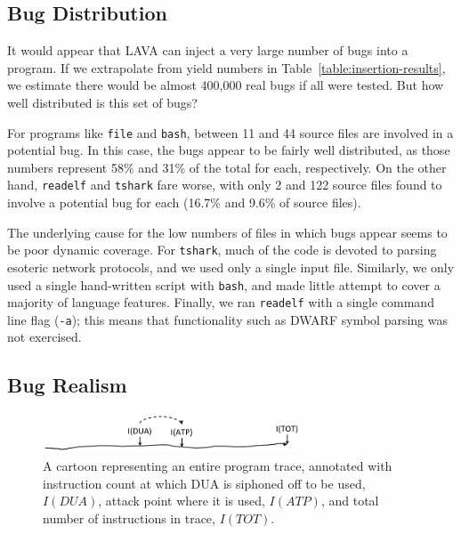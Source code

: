 \subsection{Bug Distribution}

It would appear that LAVA can inject a very large number of bugs into a program.
If we extrapolate from yield numbers in Table~\ref{table:insertion-results}, we estimate there would be almost 400,000 real bugs if all were tested.
But how well distributed is this set of bugs? 

For programs like \verb+file+ and \verb+bash+, between 11 and 44 source files  are involved in a potential bug.
In this case, the bugs appear to be fairly well distributed, as those numbers represent 58\% and 31\% of the total for each, respectively.
On the other hand, \verb+readelf+ and \verb+tshark+ fare worse, with only 2 and 122 source files found to involve a potential bug for each (16.7\% and 9.6\% of source files).

The underlying cause for the low numbers of files in which bugs appear seems to be poor dynamic coverage.
For \verb+tshark+, much of the code is devoted to parsing esoteric network protocols, and we used only a single input file.
Similarly, we only used a single hand-written script with \verb+bash+, and made little attempt to cover a majority of language features.
Finally, we ran \verb+readelf+ with a single command line flag (\verb+-a+); this means that functionality such as DWARF symbol parsing was not exercised.
 

\subsection{Bug Realism}


\begin{figure}
\centering
\includegraphics[width=3in]{trace-dua-atp.png}
\caption{A cartoon representing an entire program trace, annotated with instruction count at which DUA is siphoned off to be used, $I(DUA)$, attack point where it is used, $I(ATP)$, and total number of instructions in trace, $I(TOT)$.}
\label{fig:dua-atp-trace}
\end{figure}


